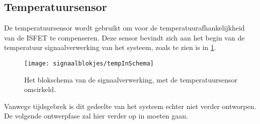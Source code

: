 \subsection{Temperatuursensor}
De temperatuursensor wordt gebruikt om voor de temperatuurafhankelijkheid van de ISFET te compenseren. Deze sensor bevindt zich aan het begin van de temperatuur signaalverwerking van het systeem, zoals te zien is in \cref{fig:tempInSchema}.

\begin{figure}[!htbp]
    \centering
    \texttt{[image: signaalblokjes/tempInSchema]}
    \caption{Het blokschema van de signaalverwerking, met de temperatuursensor omcirkeld.}
    \label{fig:tempInSchema}
\end{figure}

Vanwege tijdsgebrek is dit gedeelte van het systeem echter niet verder ontworpen. De volgende ontwerpfase zal hier verder op in moeten gaan.